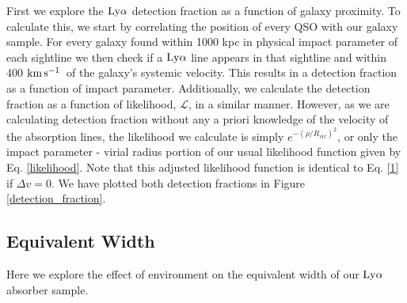 \documentclass[twocolumn,tighten]{aastex62}
\newcommand{\kms}{$\rm km\, s^{-1}$}
\begin{document}
First we explore the $\rm Ly\alpha$ detection fraction as a function of galaxy proximity. To calculate this, we start by correlating the position of every QSO with our galaxy sample. For every galaxy found within 1000 kpc in physical impact parameter of each sightline we then check if a $\rm Ly\alpha$ line appears in that sightline and within 400 \kms~of the galaxy's systemic velocity. This results in a detection fraction as a function of impact parameter. Additionally, we calculate the detection fraction as a function of likelihood, $\mathcal{L}$, in a similar manner. However, as we are calculating detection fraction without any a priori knowledge of the velocity of the absorption lines, the likelihood we calculate is simply $e^{-(\rho/R_{vir})^2}$, or only the impact parameter - virial radius portion of our usual likelihood function given by Eq. \ref{likelihood}. Note that this adjusted likelihood function is identical to Eq. \ref{1} if $\Delta v = 0$. We have plotted both detection fractions in Figure \ref{detection_fraction}. 




\subsection{Equivalent Width}

Here we explore the effect of environment on the equivalent width of our $\rm Ly\alpha$ absorber sample. 
\end{document}

